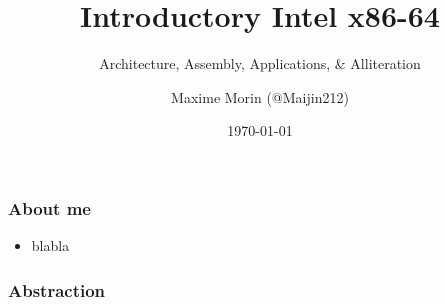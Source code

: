 \documentclass[10pt,pdf,utf8,english,compress,hyperref={unicode}]{beamer}
\title{Introductory Intel x86-64}
\subtitle{Architecture, Assembly, Applications, \& Alliteration}
\author{Maxime Morin (@Maijin212)}
\date{\today}
\institute{}
\begin{document}
\maketitle


\begin{frame}[fragile]
  \frametitle{About me}
    \begin{itemize}
    \item blabla
    \end{itemize}
\end{frame}



\begin{frame}[fragile]
  \frametitle{Abstraction}

	\begin{center}



	\end{center}

\end{frame}

\end{document}
